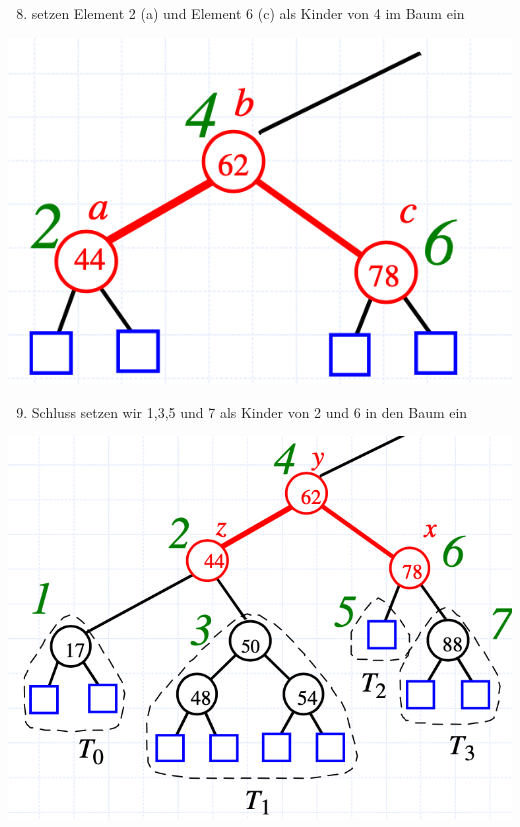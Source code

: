 \begin{enumerate}
    \setcounter{enumi}{7}
    \item setzen Element 2 (a) und Element 6 (c) als Kinder von 4 im Baum ein
\end{enumerate}
\vspace{-8pt}
\begin{center}
    \includegraphics[scale=.2]{graphic/02 AVLTrees/Cut-Link6.png}
\end{center}
\vspace{-8pt}

\begin{enumerate}
    \setcounter{enumi}{8}
    \item Schluss setzen wir 1,3,5 und 7 als Kinder von 2 und 6 in den Baum ein
\end{enumerate}
\vspace{-8pt}
\begin{center}
    \includegraphics[scale=.3]{graphic/02 AVLTrees/Cut-Link7.png}
\end{center}
\vspace{-8pt}

\newpage